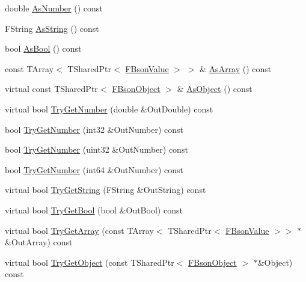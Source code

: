 \begin{DoxyCompactItemize}
\item 
double \mbox{\hyperlink{class_f_bson_value_ad23915f0921fb59d158a6ebf5ddfe5f9}{As\+Number}} () const
\item 
F\+String \mbox{\hyperlink{class_f_bson_value_aee42d2615ae788bd7374752b1c3a097d}{As\+String}} () const
\item 
bool \mbox{\hyperlink{class_f_bson_value_a0ec04eea92e4162d6887054ee8e3ab35}{As\+Bool}} () const
\item 
const T\+Array$<$ T\+Shared\+Ptr$<$ \mbox{\hyperlink{class_f_bson_value}{F\+Bson\+Value}} $>$ $>$ \& \mbox{\hyperlink{class_f_bson_value_a5a4a7cd0de121f66fd5ce0fbc78e86ed}{As\+Array}} () const
\item 
virtual const T\+Shared\+Ptr$<$ \mbox{\hyperlink{class_f_bson_object}{F\+Bson\+Object}} $>$ \& \mbox{\hyperlink{class_f_bson_value_a183af604be243a610b576dd7de32d334}{As\+Object}} () const
\item 
virtual bool \mbox{\hyperlink{class_f_bson_value_a519904f85122172ad9ca2f6b0b144f26}{Try\+Get\+Number}} (double \&Out\+Double) const
\item 
bool \mbox{\hyperlink{class_f_bson_value_a74a23bce29e9f699d0fde83663c4b3a8}{Try\+Get\+Number}} (int32 \&Out\+Number) const
\item 
bool \mbox{\hyperlink{class_f_bson_value_a5e61aa31b7c06178502e367957908e8c}{Try\+Get\+Number}} (uint32 \&Out\+Number) const
\item 
bool \mbox{\hyperlink{class_f_bson_value_a1e929bd6f5834d9a20658299605183f4}{Try\+Get\+Number}} (int64 \&Out\+Number) const
\item 
virtual bool \mbox{\hyperlink{class_f_bson_value_aa52379f3d911ed0d5c8ded6e83ceecc0}{Try\+Get\+String}} (F\+String \&Out\+String) const
\item 
virtual bool \mbox{\hyperlink{class_f_bson_value_a1c7d6b561d3cc8a7db99b850740c642e}{Try\+Get\+Bool}} (bool \&Out\+Bool) const
\item 
virtual bool \mbox{\hyperlink{class_f_bson_value_a80102a8570ea5468895c82f1bc480151}{Try\+Get\+Array}} (const T\+Array$<$ T\+Shared\+Ptr$<$ \mbox{\hyperlink{class_f_bson_value}{F\+Bson\+Value}} $>$$>$ $\ast$\&Out\+Array) const
\item 
virtual bool \mbox{\hyperlink{class_f_bson_value_a8f80bf7d02f1ac317a95fcc99776577b}{Try\+Get\+Object}} (const T\+Shared\+Ptr$<$ \mbox{\hyperlink{class_f_bson_object}{F\+Bson\+Object}} $>$ $\ast$\&Object) const
\item 
$$
\end{DoxyCompactItemize}
